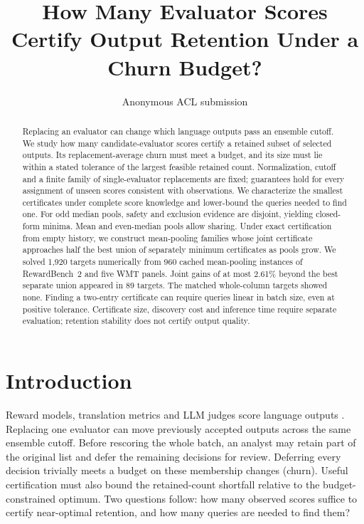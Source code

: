 \documentclass[11pt]{article}
\title{How Many Evaluator Scores Certify Output Retention Under a Churn Budget?}
\author{Anonymous ACL submission}
\begin{document}
\maketitle
\begin{abstract}
Replacing an evaluator can change which language outputs pass an ensemble cutoff. We study how many candidate-evaluator scores certify a retained subset of selected outputs. Its replacement-average churn must meet a budget, and its size must lie within a stated tolerance of the largest feasible retained count. Normalization, cutoff and a finite family of single-evaluator replacements are fixed; guarantees hold for every assignment of unseen scores consistent with observations. We characterize the smallest certificates under complete score knowledge and lower-bound the queries needed to find one. For odd median pools, safety and exclusion evidence are disjoint, yielding closed-form minima. Mean and even-median pools allow sharing. Under exact certification from empty history, we construct mean-pooling families whose joint certificate approaches half the best union of separately minimum certificates as pools grow. We solved 1,920 targets numerically from 960 cached mean-pooling instances of RewardBench~2 and five WMT panels. Joint gains of at most 2.61\% beyond the best separate union appeared in 89 targets. The matched whole-column targets showed none. Finding a two-entry certificate can require queries linear in batch size, even at positive tolerance. Certificate size, discovery cost and inference time require separate evaluation; retention stability does not certify output quality.
\end{abstract}

\section{Introduction}
Reward models, translation metrics and LLM judges score language outputs \citep{malik2026rewardbench2,freitag2023wmt23,zheng2023judging}. Replacing one evaluator can move previously accepted outputs across the same ensemble cutoff. Before rescoring the whole batch, an analyst may retain part of the original list and defer the remaining decisions for review. Deferring every decision trivially meets a budget on these membership changes (churn). Useful certification must also bound the retained-count shortfall relative to the budget-constrained optimum. Two questions follow: how many observed scores suffice to certify near-optimal retention, and how many queries are needed to find them?
\end{document}
